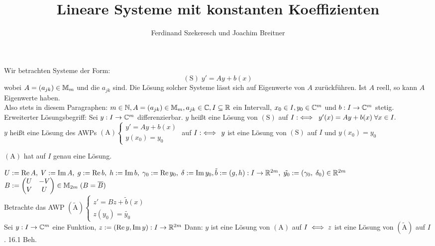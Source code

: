 \documentclass{article}
\title{Lineare Systeme mit konstanten Koeffizienten}
\author{Ferdinand Szekeresch und Joachim Breitner}
\begin{document}
\maketitle

Wir betrachten Systeme der Form:
$$(\text{S})\; y' = Ay + b(x)$$
wobei $A = (a_{jk}) \in \mathbb{M}_m$ und die $a_{jk}$  sind. Die Lösung solcher Systeme lässt sich auf Eigenwerte von $A$ zurückführen. Ist $A$ reell, so kann $A$  Eigenwerte haben. \\
Also stets in diesem Paragraphen: $m \in \mathbb{N}, A = (a_{jk}) \in \mathbb{M}_m, a_{jk} \in \mathbb{C}, I \subseteq \mathbb{R}$ ein Intervall, $x_0 \in I, y_0 \in \mathbb{C}^m$ und $b: I \rightarrow \mathbb{C}^m$ stetig.\\
Erweiterter Lösungsbegriff: Sei $y: I \rightarrow \mathbb{C}^m$ differenzierbar. $y$ heißt eine Lösung von $(\text{S})$ auf $I :\iff \; y'(x) = Ay + b(x) \; \forall x \in I.$ \\
$y$ heißt eine Lösung des AWPs $(\text{A}) \begin{cases} y' = Ay + b(x) \\ y(x_0) = y_0 \end{cases}$ auf $I :\iff \, y$ ist eine Lösung von $(\text{S})$ auf $I$ und $y(x_0) = y_0$

\begin{satz}
$(\text{A})$ hat auf $I$ genau eine Lösung.
\end{satz}

\begin{beweis}
$U:=\mathop{\rm Re}\nolimits A,\; V:=\mathop{\rm Im}\nolimits A,\; g:=\mathop{\rm Re}\nolimits b,\; h:= \mathop{\rm Im}\nolimits b,\; \gamma_0:=\mathop{\rm Re}\nolimits y_0,\; \delta:=\mathop{\rm Im}\nolimits y_0,\; \\ \tilde{b}:=(g,h): I \rightarrow \mathbb{R}^{2m},\; \tilde{y_0}:=(\gamma_0,\; \delta_0) \in \mathbb{R}^{2m}$ \\
$B:=\begin{pmatrix}U & -V \\ V & U \end{pmatrix} \in \mathbb{M}_{2m} \; (B=\overline{B})$ \\
Betrachte das AWP $(\tilde{\text{A}}) \begin{cases}z' = Bz + \tilde{b}(x) \\ z(y_0) = \tilde{y_0} \end{cases}$ \\
Sei $y: I \rightarrow \mathbb{C}^m$ eine Funktion, $z:=(\mathop{\rm Re}\nolimits y, \mathop{\rm Im}\nolimits y): I \rightarrow \mathbb{R}^{2m}$ Dann: $y$ ist eine Lösung von $(\text{A})$ auf $I \iff z$ ist eine Lösung von $(\tilde{\text{A}})$ auf $I$. 16.1 \folgt Beh.
\end{beweis}  
\end{document}
